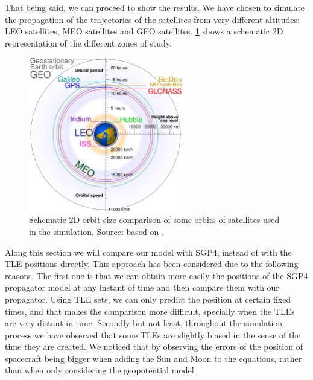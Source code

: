 \documentclass[../main.tex]{subfiles}
\begin{document}
That being said, we can proceed to show the results. We have chosen to simulate the propagation of the trajectories of the satellites from very different altitudes: LEO satellites, MEO satellites and GEO satellites. \cref{fig:satellite_orbits} shows a schematic 2D representation of the different zones of study.
\begin{figure}[ht]
  \centering
  \includegraphics[width=0.6\textwidth]{Images/satellite_orbits_custom.pdf}
  \caption{Schematic 2D orbit size comparison of some orbits of satellites used in the simulation. Source: based on \cite{wiki:sat_orbits}.}
  \label{fig:satellite_orbits}
\end{figure}

Along this section we will compare our model with SGP4, instead of with the TLE positions directly. This approach has been considered due to the following reasons. The first one is that we can obtain more easily the positions of the SGP4 propagator model at any instant of time and then compare them with our propagator. Using TLE sets, we can only predict the position at certain fixed times, and that makes the comparison more difficult, specially when the TLEs are very distant in time. Secondly but not least, throughout the simulation process we have observed that some TLEs are slightly biased in the sense of the time they are created. We noticed that by observing the errors of the position of spacecraft being bigger when adding the Sun and Moon to the equations, rather than when only considering the geopotential model.
\end{document}
